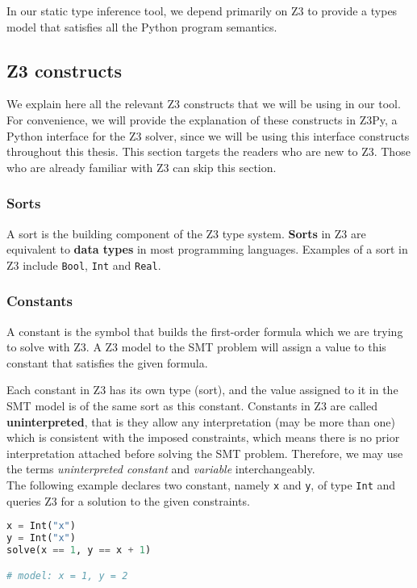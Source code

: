 In our static type inference tool, we depend primarily on Z3 to provide a types model that satisfies all the Python program semantics.

\subsection{Z3 constructs}
We explain here all the relevant Z3 constructs that we will be using in our tool. For convenience, we will provide the explanation of these constructs in Z3Py, a Python interface for the Z3 solver, since we will be using this interface constructs throughout this thesis. This section targets the readers who are new to Z3. Those who are already familiar with Z3 can skip this section.

\subsubsection{Sorts}
A sort is the building component of the Z3 type system. \textbf{Sorts} in Z3 are equivalent to \textbf{data types} in most programming languages. Examples of a sort in Z3 include \lstinline|Bool|, \lstinline|Int| and \lstinline|Real|.

\subsubsection{Constants}
A constant is the symbol that builds the first-order formula which we are trying to solve with Z3. A Z3 model to the SMT problem will assign a value to this constant that satisfies the given formula.

Each constant in Z3 has its own type (sort), and the value assigned to it in the SMT model is of the same sort as this constant. Constants in Z3 are called \textbf{uninterpreted}, that is they allow any interpretation (may be more than one) which is consistent with the imposed constraints, which means there is no prior interpretation attached before solving the SMT problem. Therefore, we may use the terms \textit{uninterpreted constant} and \textit{variable} interchangeably. \\

The following example declares two constant, namely \lstinline|x| and \lstinline|y|, of type \lstinline|Int| and queries Z3 for a solution to the given constraints.

\begin{lstlisting}[language=python]
x = Int("x")
y = Int("x")
solve(x == 1, y == x + 1)

# model: x = 1, y = 2
\end{lstlisting}

